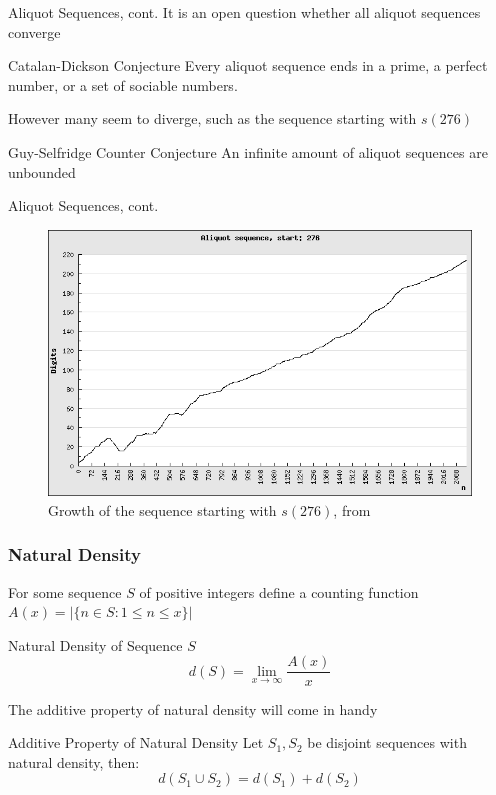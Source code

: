 \documentclass{beamer}
\begin{document}
\begin{frame}{Aliquot Sequences, cont.}
It is an open question whether all aliquot sequences converge
\begin{block}{Catalan-Dickson Conjecture}
Every aliquot sequence ends in a prime, a perfect number, or a set of sociable numbers.
\end{block}
However many seem to diverge, such as the sequence starting with $s(276)$

\begin{block}{Guy-Selfridge Counter Conjecture}
    An infinite amount of aliquot sequences are unbounded 
\end{block}
\end{frame}
\begin{frame}{Aliquot Sequences, cont.}
     \begin{figure}[h]
     \centering
     \includegraphics[width=.9\textwidth]{aliquot.png}
     \caption{Growth of the sequence starting with $s(276)$, from \textcolor{blue}{\cite{aliqSeq}}}
    \end{figure}
\end{frame}

\begin{frame}
\frametitle{Natural Density}
For some sequence $S$ of positive integers define a counting function $A(x) = |\{n \in S : 1 \leq n \leq x\}|$ 
\begin{block}{Natural Density of Sequence $S$}
$$d(S)=\lim_{x\to\infty} \frac{A(x)}{x}$$
\end{block}

The additive property of natural density will come in handy  
\begin{block}{Additive Property of Natural Density}
Let $S_1, S_2$ be disjoint sequences with natural density, then: $$d(S_1 \cup S_2) = d(S_1) + d(S_2)$$
\end{block}
\end{frame}
\end{document}
